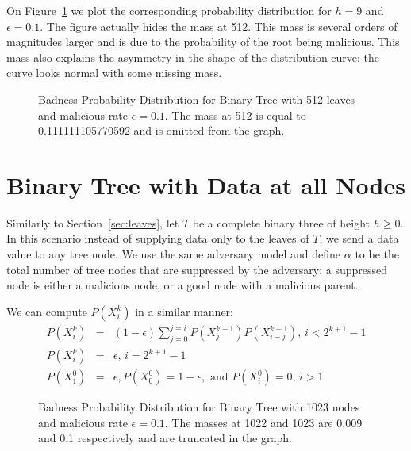 \documentclass[10pt,twocolumn]{style}
\begin{document}
  On Figure~\ref{fig:distr} we plot the corresponding probability
  distribution for $h=9$ and $\epsilon=0.1$. The figure actually hides
  the mass at 512. This mass is several orders of magnitudes larger
  and is due to the probability of the root being malicious. This mass
  also explains the asymmetry in the shape of the distribution
  curve: the curve looks normal with some missing mass.

  \begin{figure}[htpb!]
    \begin{center}
      \caption{\label{fig:distr} Badness Probability Distribution for Binary Tree with
      512 leaves and malicious rate $\epsilon=0.1$. The mass at 512 is
      equal to 0.111111105770592 and is omitted from the graph.}
    \end{center}
  \end{figure}

  \section{Binary Tree with Data at all Nodes}
  \label{sec:nodes}
  Similarly to Section~\ref{sec:leaves}, let $T$ be a complete binary
  three of height $h \geq 0$. In this scenario instead of supplying data only to the
  leaves of $T$, we send a data value to any tree node. We use the
  same adversary model and define $\alpha$ to be the total number of
  tree nodes that are suppressed by the adversary: a suppressed node
  is either a malicious node, or a good node with a malicious parent.

  We can compute $P(X^k_i)$ in a similar manner:
  \begin{eqnarray}\label{eqn:notmalicious}
    P(X^k_i) &=& (1-\epsilon)\sum_{j=0}^{j=i}P(X^{k-1}_j)P(X^{k-1}_{i-j})
    \textrm{, $i<2^{k+1}-1$}\\
    P(X^k_i) &=& \epsilon \textrm{, $i=2^{k+1}-1$}\\
     P(X^0_1)&=&\epsilon,P(X^0_0)=1-\epsilon, \textrm{ and }P(X^0_i)=0
    \textrm{, $i>1$}
  \end{eqnarray}
  
  \begin{figure}[htpb!]
    \begin{center}
      \caption{\label{fig:distr_all} Badness Probability Distribution for Binary Tree with
      1023 nodes and malicious rate $\epsilon=0.1$. The masses at 1022
      and 1023 are 0.009 and 0.1 respectively and are truncated in the
      graph.}
    \end{center}
  \end{figure}
\end{document}
